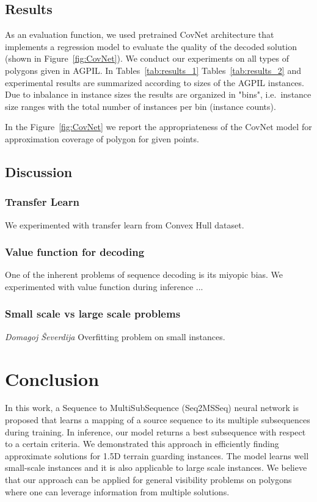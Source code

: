 \documentclass{article}
\newcommand{\todoauth}[1]{\todo[color=green!40]{#1}}
\begin{document}
\subsection{Results}



As an evaluation function, we used pretrained CovNet architecture that implements a regression model to evaluate the quality of the decoded solution (shown in Figure~\ref{fig:CovNet}). We conduct our experiments on all types of polygons given in AGPIL.
In Tables~\ref{tab:results_1} Tables~\ref{tab:results_2} and  experimental results are summarized according to sizes of the AGPIL instances. Due to inbalance in instance sizes the results are organized in "bins", i.e.~instance size ranges with the total number of instances per bin (instance counts). 



In the Figure~\ref{fig:CovNet} we report the appropriateness of the CovNet model for approximation coverage of polygon for given points.







\subsection{Discussion}
\subsubsection{Transfer Learn} \todoauth{Antonio Jovanović}

We experimented with transfer learn from Convex Hull dataset. 

\subsubsection{Value function for decoding} \todoauth{Domagoj Ševerdija}
One of the inherent problems of sequence decoding is its miyopic bias. We experimented with value function during inference ...


\subsubsection{Small scale vs large scale problems} \emph{Domagoj Ševerdija}
Overfitting problem on small instances.


\section{Conclusion}
In this work, a Sequence to MultiSubSequence (Seq2MSSeq) neural network is proposed that learns a mapping of a source sequence to its multiple subsequences during training. In inference, our model returns a best subsequence with respect to a certain criteria. We demonstrated this approach in  efficiently finding approximate solutions for 1.5D terrain guarding instances. The model learns well small-scale instances and it is also applicable to large scale instances. We believe that our approach can be applied for general visibility problems on polygons where one can leverage information from multiple solutions. 



\end{document}
